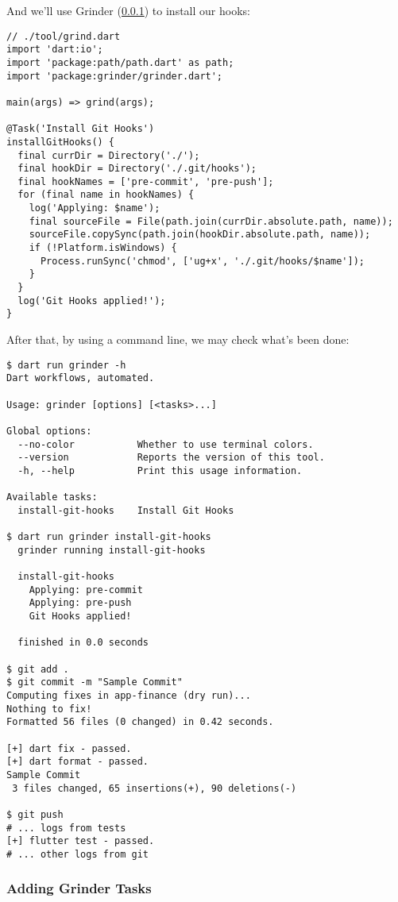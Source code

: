 \noindent And we'll use Grinder (\ref{a-grinder}) to install our hooks:

\begin{lstlisting}
// ./tool/grind.dart
import 'dart:io';
import 'package:path/path.dart' as path;
import 'package:grinder/grinder.dart';

main(args) => grind(args);

@Task('Install Git Hooks')
installGitHooks() {
  final currDir = Directory('./');
  final hookDir = Directory('./.git/hooks');
  final hookNames = ['pre-commit', 'pre-push'];
  for (final name in hookNames) {
    log('Applying: $name');
    final sourceFile = File(path.join(currDir.absolute.path, name));
    sourceFile.copySync(path.join(hookDir.absolute.path, name));
    if (!Platform.isWindows) {
      Process.runSync('chmod', ['ug+x', './.git/hooks/$name']);
    }
  }
  log('Git Hooks applied!');
}
\end{lstlisting}

\noindent After that, by using a command line, we may check what's been done:

\begin{lstlisting}[language=terminal]
$ dart run grinder -h
Dart workflows, automated.

Usage: grinder [options] [<tasks>...]

Global options:
  --no-color           Whether to use terminal colors.
  --version            Reports the version of this tool.
  -h, --help           Print this usage information.

Available tasks:
  install-git-hooks    Install Git Hooks

$ dart run grinder install-git-hooks
  grinder running install-git-hooks

  install-git-hooks
    Applying: pre-commit
    Applying: pre-push
    Git Hooks applied!

  finished in 0.0 seconds

$ git add .
$ git commit -m "Sample Commit"
Computing fixes in app-finance (dry run)...
Nothing to fix!
Formatted 56 files (0 changed) in 0.42 seconds.

[+] dart fix - passed.
[+] dart format - passed.
Sample Commit
 3 files changed, 65 insertions(+), 90 deletions(-)

$ git push
# ... logs from tests
[+] flutter test - passed.
# ... other logs from git
\end{lstlisting}


\subsubsection{Adding Grinder Tasks} \label{a-grinder}

